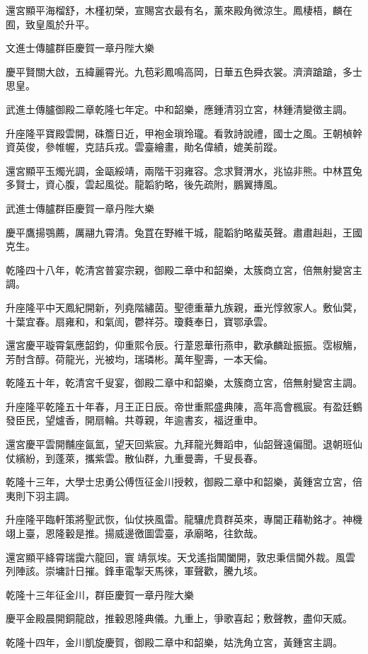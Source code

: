 \begin{pinyinscope}
還宮顯平海榴舒，木槿初榮，宣賜宮衣最有名，薰來殿角微涼生。鳳棲梧，麟在囿，致皇風於升平。

文進士傳臚群臣慶賀一章丹陛大樂

慶平賢關大啟，五緯麗霄光。九苞彩鳳鳴高岡，日華五色舜衣裳。濟濟蹌蹌，多士思皇。

武進土傳臚御殿二章乾隆七年定。中和韶樂，應鍾清羽立宮，林鍾清變徵主調。

升座隆平寶殿雲開，硃簷日近，甲袍金瑣玲瓏。看敦詩說禮，國士之風。王朝楨幹資英俊，參帷幄，克詰兵戎。雲臺繪畫，勛名偉績，媲美前蹤。

還宮顯平玉燭光調，金甌綏靖，兩階干羽雍容。念求賢渭水，兆協非熊。中林罝兔多賢士，資心腹，雲起風從。龍韜豹略，後先疏附，鵬翼摶風。

武進士傳臚群臣慶賀一章丹陛大樂

慶平鷹揚鶚薦，厲翮九霄清。兔罝在野維干城，龍韜豹略蜚英聲。肅肅赳赳，王國克生。

乾隆四十八年，乾清宮普宴宗親，御殿二章中和韶樂，太簇商立宮，倍無射變宮主調。

升座隆平中天鳳紀開新，列堯階繡茵。聖德重華九族親，垂光惇敘家人。敷仙蓂，十葉宜春。扇雍和，和氣訚，鬱祥芬。瓊蕤奉日，寶鄂承雲。

還宮慶平璇霄氣應韶鈞，仰重熙令辰。行葦恩華衎燕申，歡承麟趾振振。霑椒觴，芳酎含醇。荷龍光，光被均，瑞璘彬。萬年聖壽，一本天倫。

乾隆五十年，乾清宮千叟宴，御殿二章中和韶樂，太簇商立宮，倍無射變宮主調。

升座隆平乾隆五十年春，月王正日辰。帝世重熙盛典陳，高年高會楓宸。有盈廷鶴發臣民，望爐香，開扇輪。共尊親，年逾書亥，福迓重申。

還宮慶平雲開黼座氤氳，望天回紫宸。九拜龍光舞蹈申，仙韶聲遠偏聞。退朝班仙仗繽紛，到蓬萊，攜紫雲。散仙群，九重曼壽，千叟長春。

乾隆十三年，大學士忠勇公傅恆征金川授敕，御殿二章中和韶樂，黃鍾宮立宮，倍夷則下羽主調。

升座隆平臨軒策將聖武恢，仙仗挾風雷。龍驤虎賁群英來，專閫正藉勒銘才。神機翊上臺，恩隆轂是推。揚威邊徼圖雲臺，承廟略，往欽哉。

還宮顯平絳霄瑞靄六龍回，寰靖氛埃。天戈遙指閶闔開，敦忠秉信閫外裁。風雲列陣該。崇墉計日摧。鋒車電掣天馬徠，軍聲歡，騰九垓。

乾隆十三年征金川，群臣慶賀一章丹陛大樂

慶平金殿晨開銅龍啟，推轂恩隆典儀。九重上，爭歌喜起；敷聲教，盡仰天威。

乾隆十四年，金川凱旋慶賀，御殿二章中和韶樂，姑洗角立宮，黃鍾宮主調。


\end{pinyinscope}
